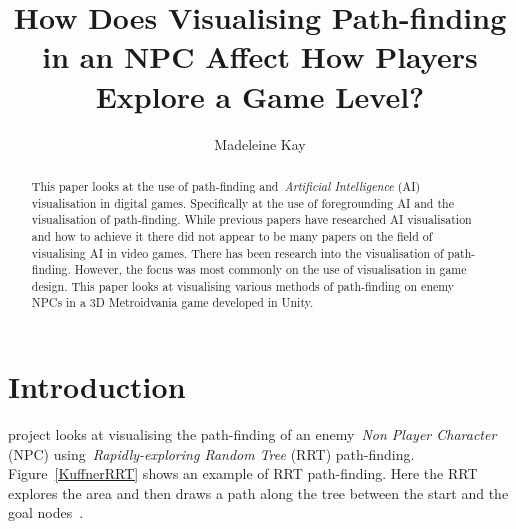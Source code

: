\documentclass[journal]{IEEEtran}
\begin{document}
	\title{ How Does Visualising Path-finding in an NPC Affect How Players Explore a Game Level?}
	\author{Madeleine Kay}
	
	
	\maketitle
	
	\begin{abstract}
		This paper looks at the use of path-finding and~\textit{Artificial Intelligence} (AI) visualisation in digital games.   Specifically at the use of foregrounding AI and the visualisation of path-finding. 
		While previous papers have researched AI visualisation and how to achieve it there did not appear to be many papers on the field of visualising AI in video games. There has been research into the visualisation of path-finding. However, the focus was most commonly on the use of visualisation in game design. 
		This paper looks at visualising various methods of path-finding on enemy NPCs in a 3D Metroidvania game developed in Unity.
		
	\end{abstract}
	
	\section{Introduction} \label{introduction}
	 project looks at visualising the path-finding of an enemy~\textit{Non Player Character} (NPC) using~\textit{Rapidly-exploring Random Tree} (RRT) path-finding.  Figure~\ref{KuffnerRRT} shows an example of RRT path-finding. Here the RRT explores the area and then draws a path along the tree between the start and the goal nodes~\cite{Kuffner2000}. 
	
\end{document}
